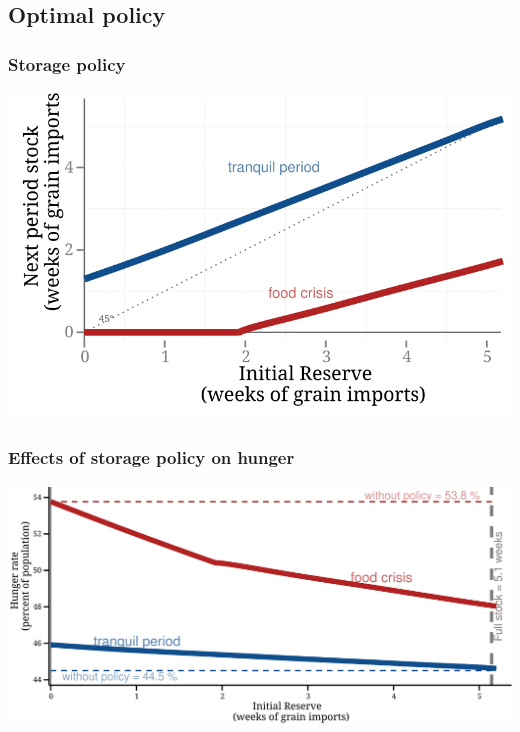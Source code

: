 \documentclass[svgnames]{beamer}
\begin{document}
\subsection{Optimal policy}
\begin{frame}
\frametitle{Storage policy}
\centering
\includegraphics[width=\textwidth]{Storage-policy}
\end{frame}


\begin{frame}[label=hunger-policy]
\frametitle{Effects of storage policy on hunger}
\centering
\includegraphics[width=\textwidth]{Hunger-policy}
\end{frame}
\end{document}
